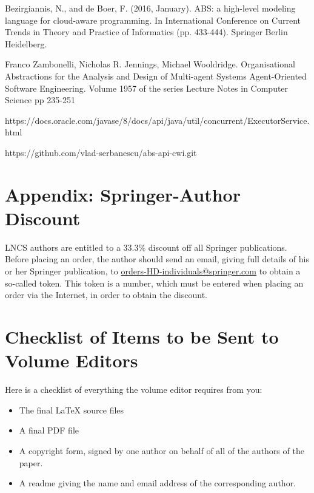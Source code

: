 \documentclass[runningheads,a4paper]{llncs}
\begin{document}
\begin{thebibliography}{4}
 Bezirgiannis, N., and de Boer, F. (2016, January). ABS: a high-level modeling language for cloud-aware programming. In International Conference on Current Trends in Theory and Practice of Informatics (pp. 433-444). Springer Berlin Heidelberg.

Franco Zambonelli, Nicholas R. Jennings, Michael Wooldridge. 
Organisational Abstractions for the Analysis and Design of Multi-agent Systems
Agent-Oriented Software Engineering. Volume 1957 of the series Lecture Notes in Computer Science pp 235-251

 https://docs.oracle.com/javase/8/docs/api/java/util/concurrent/ExecutorService.html

https://github.com/vlad-serbanescu/abs-api-cwi.git
\end{thebibliography}


\section*{Appendix: Springer-Author Discount}

LNCS authors are entitled to a 33.3\% discount off all Springer
publications. Before placing an order, the author should send an email, 
giving full details of his or her Springer publication,
to \url{orders-HD-individuals@springer.com} to obtain a so-called token. This token is a
number, which must be entered when placing an order via the Internet, in
order to obtain the discount.

\section{Checklist of Items to be Sent to Volume Editors}
Here is a checklist of everything the volume editor requires from you:


\begin{itemize}
\settowidth{\leftmargin}{{\Large$\square$}}\advance\leftmargin{}
\itemsep8pt\relax
\renewcommand\labelitemi{{\lower1.5pt\hbox{\Large$\square$}}}

\item The final \LaTeX{} source files
\item A final PDF file
\item A copyright form, signed by one author on behalf of all of the
authors of the paper.
\item A readme giving the name and email address of the
corresponding author.
\end{itemize}
\end{document}
